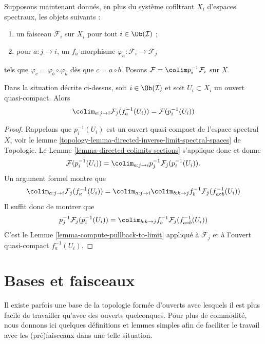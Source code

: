 \noindent
Supposons maintenant donnés, en plus du système cofiltrant $X_i$ d'espaces spectraux,
les objets suivants :
\begin{enumerate}
\item un faisceau $\mathcal{F}_i$ sur $X_i$ pour tout $i \in \Ob(\mathcal{I})$ ;
\item pour $a : j \to i$, un $f_a$-morphisme
$\varphi_a : \mathcal{F}_i \to \mathcal{F}_j$
\end{enumerate}
tels que $\varphi_c = \varphi_b \circ \varphi_a$
dès que $c = a \circ b$. Posons $\mathcal{F} = \colim p_i^{-1}\mathcal{F}_i$
sur $X$.

\begin{lemma}
\label{lemma-descend-opens}
Dans la situation décrite ci-dessus, soit $i \in \Ob(\mathcal{I})$ et soit
$U_i \subset X_i$ un ouvert quasi-compact. Alors
$$
\colim_{a : j \to i} \mathcal{F}_j(f_a^{-1}(U_i)) = \mathcal{F}(p_i^{-1}(U_i))
$$
\end{lemma}

\begin{proof}
Rappelons que $p_i^{-1}(U_i)$ est un ouvert quasi-compact de l'espace spectral
$X$, voir le
lemme \ref{topology-lemma-directed-inverse-limit-spectral-spaces} de Topologie.
Le Lemme \ref{lemma-directed-colimits-sections} s'applique donc et donne
$$
\mathcal{F}(p_i^{-1}(U_i)) =
\colim_{a : j \to i} p_j^{-1}\mathcal{F}_j(p_i^{-1}(U_i)).
$$
Un argument formel montre que
$$
\colim_{a : j \to i} \mathcal{F}_j(f_a^{-1}(U_i)) =
\colim_{a : j \to i} \colim_{b : k \to j}
f_b^{-1}\mathcal{F}_j(f_{a \circ b}^{-1}(U_i))
$$
Il suffit donc de montrer que
$$
p_j^{-1}\mathcal{F}_j(p_i^{-1}(U_i)) =
\colim_{b : k \to j} f_b^{-1}\mathcal{F}_j(f_{a \circ b}^{-1}(U_i))
$$
C'est le Lemme \ref{lemma-compute-pullback-to-limit}
appliqué à $\mathcal{F}_j$ et à l'ouvert quasi-compact $f_a^{-1}(U_i)$.
\end{proof}









\section{Bases et faisceaux}
\label{section-bases}

\noindent
Il existe parfois une base de la topologie
formée d'ouverts avec lesquels il est plus facile de travailler
qu'avec des ouverts quelconques. Pour plus de commodité, nous donnons ici
quelques définitions et lemmes simples afin de
faciliter le travail avec les (pré)faisceaux dans une telle situation.

